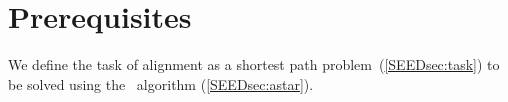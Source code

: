 \section{Prerequisites} \label{SEEDsec:prereq}

We define the task of alignment as a shortest path problem~(\cref{SEEDsec:task}) to
be solved using the \A~algorithm (\cref{SEEDsec:astar}).
%


